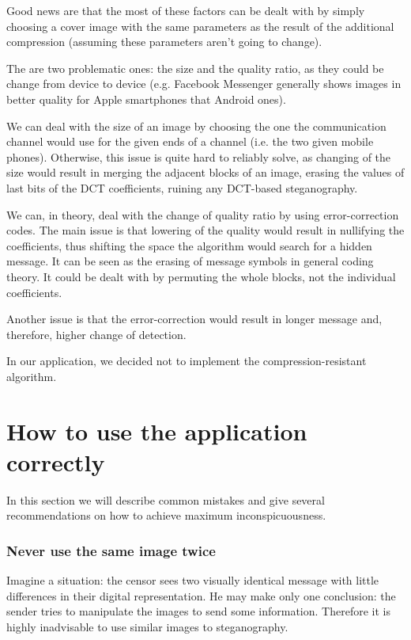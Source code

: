 Good news are that the most of these factors can be dealt with by simply choosing a cover
image with the same parameters as the result of the additional compression (assuming 
these parameters aren't going to change).   

The are two problematic ones: the size and the quality ratio, as they could be change
from device to device (e.g. Facebook Messenger generally shows images in better 
quality for Apple smartphones that Android ones). 

We can deal with the size of an image by choosing the one the communication channel 
would use for the given ends of a channel (i.e. the two given mobile phones). Otherwise,
this issue is quite hard to reliably solve, as changing of the size would result in
merging the adjacent blocks of an image, erasing the values of last bits of the DCT coefficients,
ruining any DCT-based steganography.

We can, in theory, deal with the change of quality ratio by using error-correction codes.
The main issue is that lowering of the quality would result in nullifying the coefficients,
thus shifting the space the algorithm would search for a hidden message. It can be seen
as the erasing of message symbols in general coding theory. It could be dealt with
by permuting the whole blocks, not the individual coefficients.

Another issue is that the error-correction would result in longer message and, therefore,
higher change of detection.

In our application, we decided not to implement the compression-resistant algorithm.

\section{How to use the application correctly}
In this section we will describe common mistakes and give several recommendations on
how to achieve maximum inconspicuousness.

\subsubsection{Never use the same image twice}

Imagine a situation: the censor sees two visually identical message with little 
differences in their digital representation. He may make only one conclusion: 
the sender tries to manipulate the images to send some information. Therefore
it is highly inadvisable to use similar images to steganography.

